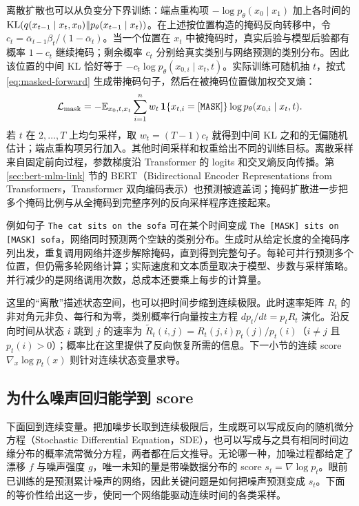 离散扩散也可以从负变分下界训练：端点重构项 \(-\log p_\theta(x_0\mid x_1)\) 加上各时间的 \(\mathrm{KL}(q(x_{t-1}\mid x_t,x_0)\Vert p_\theta(x_{t-1}\mid x_t))\)。在上述按位置构造的掩码反向转移中，令 \(c_t=\bar\alpha_{t-1}\beta_t/(1-\bar\alpha_t)\)。当一个位置在 \(x_t\) 中被掩码时，真实后验与模型后验都有概率 \(1-c_t\) 继续掩码；剩余概率 \(c_t\) 分别给真实类别与网络预测的类别分布。因此该位置的中间 KL 恰好等于 \(-c_t\log p_\theta(x_{0,i}\mid x_t,t)\)。实际训练可随机抽 \(t\)，按式 \eqref{eq:masked-forward} 生成带掩码句子，然后在被掩码位置做加权交叉熵：
\begin{equation}
 \mathcal L_{\mathrm{mask}}
 =-\mathbb{E}_{x_0,t,x_t}\sum_{i=1}^{n}
 w_t\,\mathbf1\{x_{t,i}=\mathtt{[MASK]}\}
 \log p_\theta(x_{0,i}\mid x_t,t).
 \label{eq:masked-diffusion-loss}
\end{equation}
若 \(t\) 在 \(2,\ldots,T\) 上均匀采样，取 \(w_t=(T-1)c_t\) 就得到中间 KL 之和的无偏随机估计；端点重构项另行加入。其他时间采样和权重给出不同的训练目标。离散采样来自固定前向过程，参数梯度沿 Transformer 的 logits 和交叉熵反向传播。第 \ref{sec:bert-mlm-link} 节的 BERT（Bidirectional Encoder Representations from Transformers，Transformer 双向编码表示）也预测被遮盖词；掩码扩散进一步把多个掩码比例与从全掩码到完整序列的反向采样程序连接起来。

例如句子 \texttt{The cat sits on the sofa} 可在某个时间变成 \texttt{The [MASK] sits on [MASK] sofa}，网络同时预测两个空缺的类别分布。生成时从给定长度的全掩码序列出发，重复调用网络并逐步解除掩码，直到得到完整句子。每轮可并行预测多个位置，但仍需多轮网络计算；实际速度和文本质量取决于模型、步数与采样策略。并行减少的是网络调用次数，总成本还要乘上每步的计算量。

这里的“离散”描述状态空间，也可以把时间步缩到连续极限。此时速率矩阵 \(R_t\) 的非对角元非负、每行和为零，类别概率行向量按主方程 \(dp_t/dt=p_tR_t\) 演化。沿反向时间从状态 \(i\) 跳到 \(j\) 的速率为 \(\widetilde R_t(i,j)=R_t(j,i)p_t(j)/p_t(i)\)（\(i\neq j\) 且 \(p_t(i)>0\)）；概率比在这里提供了反向恢复所需的信息。下一小节的连续 score \(\nabla_x\log p_t(x)\) 则针对连续状态变量求导。

\subsection{为什么噪声回归能学到 score}

下面回到连续变量。把加噪步长取到连续极限后，生成既可以写成反向的随机微分方程（Stochastic Differential Equation，SDE），也可以写成与之具有相同时间边缘分布的概率流常微分方程，两者都在后文推导。无论哪一种，加噪过程都给定了漂移 \(f\) 与噪声强度 \(g\)，唯一未知的量是带噪数据分布的 score \(s_t=\nabla\log p_t\)。眼前已训练的是预测累计噪声的网络，因此关键问题是如何把噪声预测变成 \(s_t\)。下面的等价性给出这一步，使同一个网络能驱动连续时间的各类采样。

